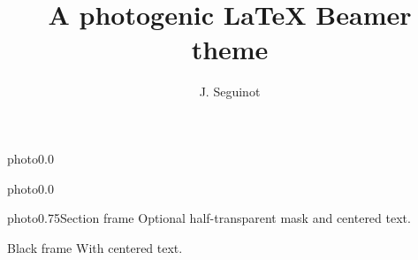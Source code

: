 \documentclass[aspectratio=1610]{beamer}
\title{A photogenic LaTeX Beamer theme}
\author[seguinot@vaw.baug.ethz.ch]{J. Seguinot}
\institute{ETH Zürich, Switzerland}
\begin{document}

    \begin{backgroundframe}[b]{photo}{0.0}{}
      \flushleft{}
    \end{backgroundframe}

    \begin{backgroundframe}[t]{photo}{0.0}{}
      \flushright{}
    \end{backgroundframe}

    \begin{sectionframe}{photo}{0.75}{Section frame}
      Optional half-transparent mask and centered text.
    \end{sectionframe}

    \begin{darkframe}{Black frame}
      With centered text.
    \end{darkframe}

\end{document}

